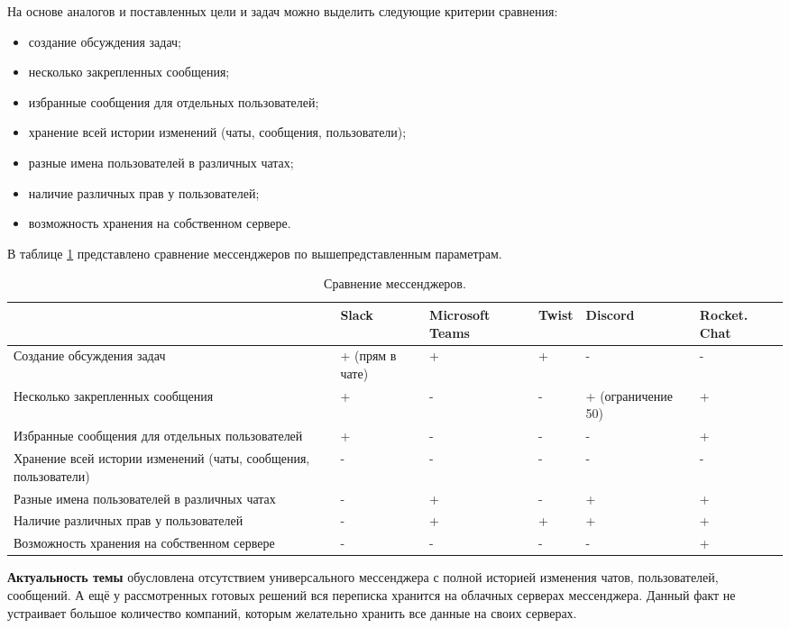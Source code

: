 На основе аналогов и поставленных цели и задач можно выделить следующие критерии сравнения:

\begin{itemize}
\item создание обсуждения задач;
\item несколько закрепленных сообщения;
\item избранные сообщения для отдельных пользователей;
\item хранение всей истории изменений (чаты, сообщения, пользователи);
\item разные имена пользователей в различных чатах;
\item наличие различных прав у пользователей; 
\item возможность хранения на собственном сервере. 
\end{itemize}

В таблице \ref{table:messagecompare} представлено сравнение мессенджеров по вышепредставленным параметрам. 

\begin{table}[H]
\caption{Сравнение мессенджеров. }
\begin{tabular}{|p{5cm}|p{1.9cm}|p{1.9cm}|p{1.9cm}|p{1.9cm}|p{1.5cm}|}
\hline
 & Slack & Microsoft Teams  & Twist & Discord & Rocket. Chat  \\ \hline
Создание обсуждения задач & + (прям в чате) & + & + & - & - \\ \hline
Несколько закрепленных сообщения & +  & - & - &  + (ограничение 50)  & +  \\ \hline
Избранные сообщения для отдельных пользователей  & +  & - & - & -  & + \\ \hline
Хранение всей истории изменений (чаты, сообщения, пользователи)& - &-& - & - & - \\ \hline
Разные имена пользователей в различных чатах& - & +& - &  + & + \\ \hline
Наличие различных прав у пользователей& - & + & + &  + & + \\ \hline
Возможность хранения на собственном сервере& - & - & - &  - & + \\ \hline
\end{tabular}
\label{table:messagecompare}
\end{table}

\textbf{Актуальность темы} обусловлена отсутствием универсального мессенджера с полной историей изменения чатов, пользователей, сообщений. А ещё у рассмотренных готовых решений вся переписка хранится на облачных серверах мессенджера. Данный факт не устраивает большое количество компаний, которым желательно хранить все данные на своих серверах. 

